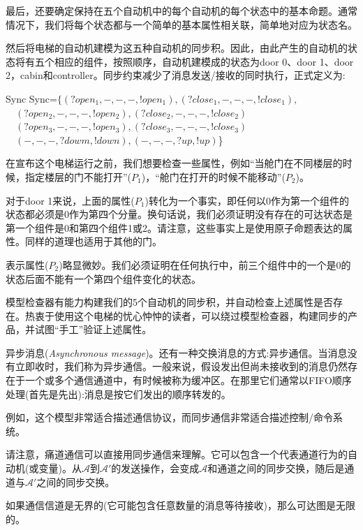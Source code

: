 \documentclass{book}
\begin{document}
    最后，还要确定保持在五个自动机中的每个自动机的每个状态中的基本命题。通常情况下，我们将每个状态都与一个简单的基本属性相关联，简单地对应为状态名。

    然后将电梯的自动机建模为这五种自动机的同步积。因此，由此产生的自动机的状态将有五个相应的组件，按照顺序，自动机建模成的状态为door  0、door 1、door 2，cabin和controller。同步约束减少了消息发送/接收的同时执行，正式定义为:
    \begin{tabbing}
      Sync  \kill
      Sync=$\{(?open_1,-,-,-,!open_1),(?close_1,-,-,-,!close_1),$\\
     $ \quad(?open_2,-,-,-,!open_2),(?close_2,-,-,-,!close_2)$\\
     $ \quad(?open_3,-,-,-,!open_3),(?close_3,-,-,-,!close_3)$\\
      $\quad(-,-,-,?dowm,!down),(-,-,-,?up,!up)$\}
    \end{tabbing}

    在宣布这个电梯运行之前，我们想要检查一些属性，例如“当舱门在不同楼层的时候，指定楼层的门不能打开”($P_1$)，“舱门在打开的时候不能移动”($P_2$)。

    对于door 1来说，上面的属性($P_1$)转化为一个事实，即任何以0作为第一个组件的状态都必须是0作为第四个分量。换句话说，我们必须证明没有存在的可达状态是第一个组件是0和第四个组件1或2。请注意，这些事实上是使用原子命题表达的属性。同样的道理也适用于其他的门。

    表示属性($P_2$)略显微妙。我们必须证明在任何执行中，前三个组件中的一个是0的状态后面不能有一个第四个组件变化的状态。

    模型检查器有能力构建我们的5个自动机的同步积，并自动检查上述属性是否存在。热衷于使用这个电梯的忧心忡忡的读者，可以绕过模型检查器，构建同步的产品，并试图“手工”验证上述属性。

    异步消息({\itshape Asynchronous message})。还有一种交换消息的方式:异步通信。当消息没有立即收时，我们称为异步通信。一般来说，假设发出但尚未接收到的消息仍然存在于一个或多个通信通道中，有时候被称为缓冲区。在那里它们通常以FIFO顺序处理(首先是先出):消息是按它们发出的顺序转发的。

    例如，这个模型非常适合描述通信协议，而同步通信非常适合描述控制/命令系统。

    请注意，痛道通信可以直接用同步通信来理解。它可以包含一个代表通道行为的自动机(或变量)。从$\mathcal{A}$到$\mathcal{A'}$的发送操作，会变成$\mathcal{A}$和通道之间的同步交换，随后是通道与$\mathcal{A'}$之间的同步交换。

    如果通信信道是无界的(它可能包含任意数量的消息等待接收)，那么可达图是无限的。
\end{document}
